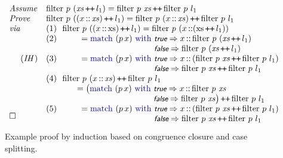 \begin{figure}[t]
\renewcommand\arraystretch{1.3}
\newcommand\ih{~~~~(\textit{IH}\,)}
\[
\begin{array}{l@{\quad}l}
\textit{Assume} & 
\tfilter~p~(\mathit{xs} \concat l_1) =
 \tfilter~p~\mathit{xs} \concat \tfilter~p~l_1
 \\
\textit{Prove} &
 \tfilter~p~((x \cons \mathit{xs}) \concat l_1) =
 \tfilter~p~(x \cons \mathit{xs}) \concat \tfilter~p~l_1
\\
\textit{via} & (1)~~ \tfilter~p~((x \cons \mathrm{xs}) \concat l_1) 
                 = \tfilter~p~(x \cons (\mathrm{xs} \concat l_1)) \\
             & (2)~~ \qquad = \tmatch~(p\,x)~\twith~
                \begin{array}[t]{@{}l@{}}
                  \ttrue\Rightarrow 
                       x\cons\tfilter~p~(\textit{xs} \concat l_1) \\
                  \tfalse\Rightarrow 
                              \tfilter~p~(\textit{xs} \concat l_1)
                \end{array} \\
    \ih      & (3)~~ \qquad = \tmatch~(p\,x)~\twith~
                \begin{array}[t]{@{}l@{}}
                  \ttrue\Rightarrow 
                       x\cons {(\tfilter~p~\mathit{xs} \concat 
                                \tfilter~p~l_1)} \\
                  \tfalse\Rightarrow 
                              \tfilter~p~\mathit{xs} \concat 
                                \tfilter~p~l_1 
                \end{array} \\
             & (4)~~\tfilter~p~(x \cons \mathit{xs}) \concat 
                    \tfilter~p~l_1 \\
             & \hspace{1.3cm} = \big(\tmatch~(p\,x)~\twith~
                \begin{array}[t]{@{}l@{}}
                  \ttrue\Rightarrow 
                       x\cons \tfilter~p~\mathit{xs} \\
                  \tfalse\Rightarrow  \tfilter~p~\mathit{xs}\big)
                      \concat \tfilter~p~l_1
                \end{array} \\
             & (5)~~ \qquad = \tmatch~(p\,x)~\twith~
                \begin{array}[t]{@{}l@{}}
                  \ttrue\Rightarrow 
                       x\cons {(\tfilter~p~\mathit{xs} \concat 
                                \tfilter~p~l_1)} \\
                  \tfalse\Rightarrow 
                              \tfilter~p~\mathit{xs} \concat 
                                \tfilter~p~l_1 
                \end{array} \\[-1.5em]
\square &
\end{array}
\]
\vspace{-5mm}
\caption{Example proof by induction based on congruence closure and
  case splitting.}
  \label{overview:induction-example}
\end{figure}

